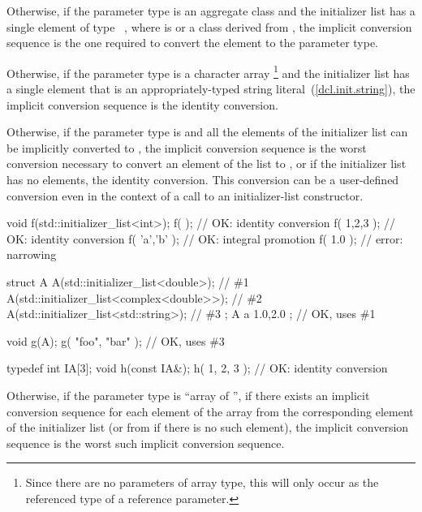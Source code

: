 \pnum
Otherwise,
if the parameter type is an aggregate class  and the initializer list has a
single element of type \cv{}~, where  is 
or a class derived from , the implicit conversion sequence is the one
required to convert the element to the parameter type.

\pnum
Otherwise, if the parameter type is a character array%
\footnote{Since there are no parameters of array type,
this will only occur as the referenced type of a reference parameter.}
and the initializer list has a single element that is an appropriately-typed
string literal~(\ref{dcl.init.string}), the implicit conversion
sequence is the identity conversion.

\pnum
Otherwise, if the parameter type is 
and all the elements
of the initializer list can be implicitly converted to , the implicit
conversion sequence is the worst conversion necessary to convert an element of
the list to , or if the initializer list has no elements, the identity
conversion. This conversion can be a user-defined conversion even in
the context of a call to an initializer-list constructor. \begin{example}
\begin{codeblock}
void f(std::initializer_list<int>);
f( {} );                // OK:  identity conversion
f( {1,2,3} );           // OK:  identity conversion
f( {'a','b'} );         // OK:  integral promotion
f( {1.0} );             // error: narrowing

struct A {
  A(std::initializer_list<double>);             // \#1
  A(std::initializer_list<complex<double>>);    // \#2
  A(std::initializer_list<std::string>);        // \#3
};
A a{ 1.0,2.0 };         // OK, uses \#1

void g(A);
g({ "foo", "bar" });    // OK, uses \#3

typedef int IA[3];
void h(const IA&);
h({ 1, 2, 3 });         // OK: identity conversion
\end{codeblock}
\end{example}

\pnum
Otherwise, if the parameter type is ``array of  '',
if there exists an implicit conversion sequence for each element of the array
from the corresponding element of the initializer list (or from \tcode{\{\}}
if there is no such element), the implicit conversion sequence is
the worst such implicit conversion sequence.

